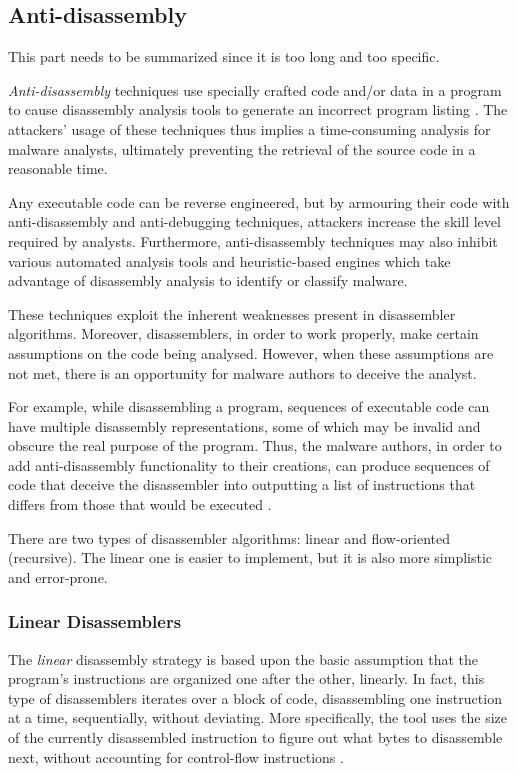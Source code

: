 \documentclass[pdfa%
,cucitura%
]{toptesi}
\begin{document}
\subsection{Anti-disassembly}
\color{Green}
This part needs to be summarized since it is too long and too specific.
\color{Black}

\textit{Anti-disassembly} techniques use specially crafted code and/or data in a program to cause disassembly analysis tools to generate an incorrect program listing \cite{SikorskiPMA}. The attackers' usage of these techniques thus implies a time-consuming analysis for malware analysts, ultimately preventing the retrieval of the source code in a reasonable time.

Any executable code can be reverse engineered, but by armouring their code with anti-disassembly and anti-debugging techniques, attackers increase the skill level required by analysts.
Furthermore, anti-disassembly techniques may also inhibit various automated analysis tools and heuristic-based engines which take advantage of disassembly analysis to identify or classify malware.

These techniques exploit the inherent weaknesses present in disassembler algorithms. Moreover, disassemblers, in order to work properly, make certain assumptions on the code being analysed. However, when these assumptions are not met, there is an opportunity for malware authors to deceive the analyst.

For example, while disassembling a program, sequences of executable code can have multiple disassembly representations, some of which may be invalid and obscure the real purpose of the program.
Thus, the malware authors, in order to add anti-disassembly functionality to their creations, can produce sequences of code that deceive the disassembler into outputting a list of instructions that differs from those that would be executed \cite{SikorskiPMA}.

There are two types of disassembler algorithms: linear and flow-oriented (recursive).
The linear one is easier to implement, but it is also more simplistic and error-prone.

\subsubsection{Linear Disassemblers}
The \textit{linear} disassembly strategy is based upon the basic assumption that the program's instructions are organized one after the other, linearly. In fact, this type of disassemblers iterates over a block of code, disassembling one instruction at a time, sequentially, without deviating. More specifically, the tool uses the size of the currently disassembled instruction to figure out what bytes to disassemble next, without accounting for control-flow instructions \cite{SikorskiPMA}.
\end{document}
